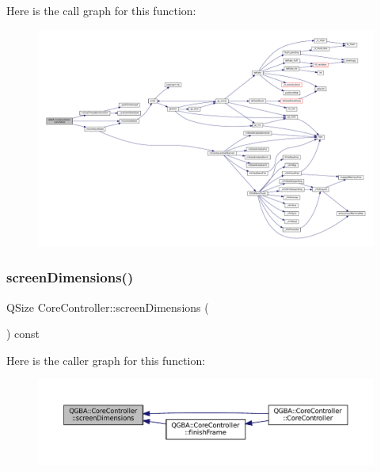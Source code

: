 Here is the call graph for this function\+:
\nopagebreak
\begin{figure}[H]
\begin{center}
\leavevmode
\includegraphics[width=350pt]{class_q_g_b_a_1_1_core_controller_a1d7445620b89f8c7a2c4d4d55bc71e60_cgraph}
\end{center}
\end{figure}
\mbox{\label{class_q_g_b_a_1_1_core_controller_a8f1f4a7dc619a569cf6546e5e8bb4ee5}} 
\subsubsection{\texorpdfstring{screen\+Dimensions()}{screenDimensions()}}
{\footnotesize\ttfamily Q\+Size Core\+Controller\+::screen\+Dimensions (\begin{DoxyParamCaption}{ }\end{DoxyParamCaption}) const}

Here is the caller graph for this function\+:
\nopagebreak
\begin{figure}[H]
\begin{center}
\leavevmode
\includegraphics[width=350pt]{class_q_g_b_a_1_1_core_controller_a8f1f4a7dc619a569cf6546e5e8bb4ee5_icgraph}
\end{center}
\end{figure}
\mbox{\label{class_q_g_b_a_1_1_core_controller_a8577665591ba435a0a61c40e5b3903e2}} 
